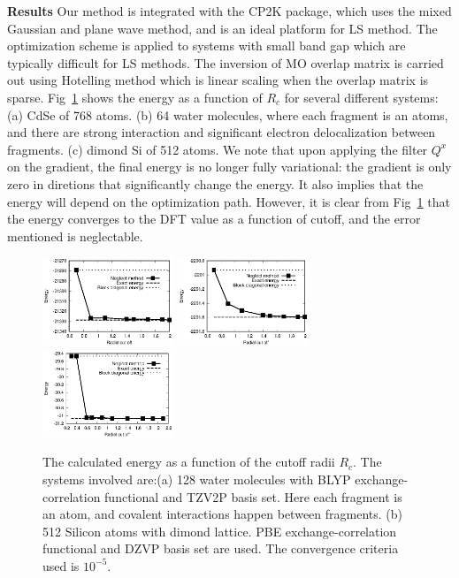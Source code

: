 \documentclass[prl,twocolumn,showpacs]{revtex4}
\begin{document}
\textbf{Results}
Our method is integrated with the CP2K package\cite{cp2kgeneral}, which uses the mixed Gaussian and plane wave method\cite{vandevondele2005quickstep}, and is an ideal platform for LS method. The optimization scheme is applied to systems with small band gap which are typically difficult for LS methods. The inversion of MO overlap matrix is carried out using Hotelling method \cite{hotelling1943some} which is linear scaling when the overlap matrix is sparse. Fig~\ref{fig:accuracy} shows the energy as a function of $R_c$ for several different systems: (a) CdSe of 768 atoms. (b) 64 water molecules, where each fragment is an atoms, and there are strong interaction and significant electron delocalization between fragments. (c) dimond Si of 512 atoms. We note that upon applying the filter $Q^x$ on the gradient, the final energy is no longer fully variational: the gradient is only zero in diretions that significantly change the energy. It also implies that the energy will depend on the optimization path. However, it is clear from Fig~\ref{fig:accuracy} that the energy converges to the DFT value as a function of cutoff, and the error mentioned is neglectable. 

\begin{figure}
\includegraphics[width=0.35\textwidth]{CdSe}
\includegraphics[width=0.35\textwidth]{H2O}
\includegraphics[width=0.35\textwidth]{Si}
\caption{The calculated energy as a function of the cutoff radii $R_c$. The systems involved are:(a) 128 water molecules with BLYP exchange-correlation functional and TZV2P basis set. Here each fragment is an atom, and covalent interactions happen between fragments. (b) 512 Silicon atoms with dimond lattice. PBE exchange-correlation functional and DZVP basis set are used. The convergence criteria used is $10^{-5}$.}
\label{fig:accuracy}
\end{figure}
\end{document}
